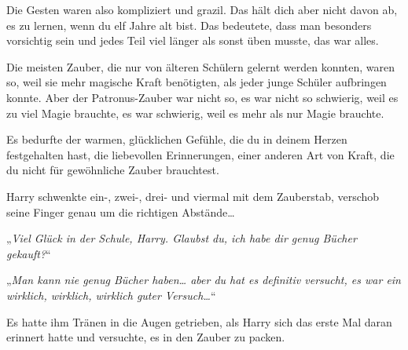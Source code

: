 Die Gesten waren also kompliziert und grazil. Das hält dich aber nicht davon ab, es zu lernen, wenn du elf Jahre alt bist. Das bedeutete, dass man besonders vorsichtig sein und jedes Teil viel länger als sonst üben musste, das war alles.

Die meisten Zauber, die nur von älteren Schülern gelernt werden konnten, waren so, weil sie mehr magische Kraft benötigten, als jeder junge Schüler aufbringen konnte. Aber der Patronus-Zauber war nicht so, es war nicht so schwierig, weil es zu viel Magie brauchte, es war schwierig, weil es mehr als nur Magie brauchte.

Es bedurfte der warmen, glücklichen Gefühle, die du in deinem Herzen festgehalten hast, die liebevollen Erinnerungen, einer anderen Art von Kraft, die du nicht für gewöhnliche Zauber brauchtest.

Harry schwenkte ein-, zwei-, drei- und viermal mit dem Zauberstab, verschob seine Finger genau um die richtigen Abstände…

„\emph{Viel Glück in der Schule, Harry. Glaubst du, ich habe dir genug Bücher gekauft?}“

„\emph{Man kann nie genug Bücher haben… aber du hat es \emph{definitiv} versucht, es war ein wirklich, wirklich, wirklich guter Versuch…}“

Es hatte ihm Tränen in die Augen getrieben, als Harry sich das erste Mal daran erinnert hatte und versuchte, es in den Zauber zu packen.

